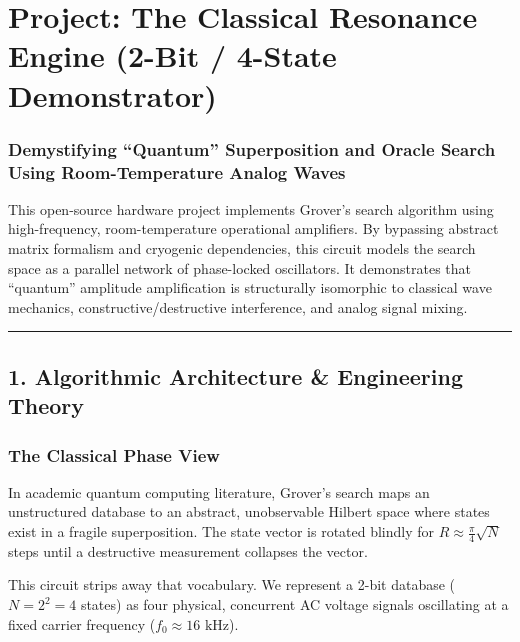 \documentclass[
]{article}
\author{}
\date{}
\begin{document}
\section{Project: The Classical Resonance Engine (2-Bit / 4-State
Demonstrator)}\label{project-the-classical-resonance-engine-2-bit-4-state-demonstrator}

\subsubsection{Demystifying ``Quantum'' Superposition and Oracle Search
Using Room-Temperature Analog
Waves}\label{demystifying-quantum-superposition-and-oracle-search-using-room-temperature-analog-waves}

This open-source hardware project implements Grover's search algorithm
using high-frequency, room-temperature operational amplifiers. By
bypassing abstract matrix formalism and cryogenic dependencies, this
circuit models the search space as a parallel network of phase-locked
oscillators. It demonstrates that ``quantum'' amplitude amplification is
structurally isomorphic to classical wave mechanics,
constructive/destructive interference, and analog signal mixing.

\begin{center}\rule{0.5\linewidth}{0.5pt}\end{center}

\subsection{1. Algorithmic Architecture \& Engineering
Theory}\label{algorithmic-architecture-engineering-theory}

\subsubsection{The Classical Phase View}\label{the-classical-phase-view}

In academic quantum computing literature, Grover's search maps an
unstructured database to an abstract, unobservable Hilbert space where
states exist in a fragile superposition. The state vector is rotated
blindly for \(R \approx \frac{\pi}{4}\sqrt{N}\) steps until a
destructive measurement collapses the vector.

This circuit strips away that vocabulary. We represent a 2-bit database
(\(N = 2^2 = 4\) states) as four physical, concurrent AC voltage signals
oscillating at a fixed carrier frequency
(\(f_0 \approx 16\text{ kHz}\)).
\end{document}
